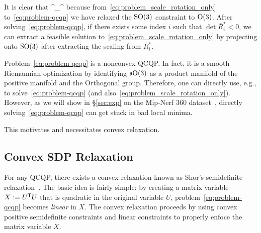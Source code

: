 It is clear that 
\bea\label{eq:qcqp-inequality}
\rho^\star_\qcqp \leq \rho^\star
\eea
because from~\eqref{eq:problem_scale_rotation_only} to~\eqref{eq:problem-qcqp} we have relaxed the $\mathrm{SO}(3)$ constraint to $\mathrm{O}(3)$.
After solving~\eqref{eq:problem-qcqp},  
if there exists some index $i$ such that $\det{\bar{R}_i^\star} < 0$, we can extract a feasible solution to~\eqref{eq:problem_scale_rotation_only} by projecting onto $\mathrm{SO}(3)$ after extracting the scaling from $\bar{R}_i^\star$.

\begin{remark}
    Problem~\eqref{eq:problem-qcqp} is a nonconvex QCQP. In fact, it is a smooth Riemannian optimization by identifying $\mathfrak{s}\mathrm{O}(3)$ as a product manifold of the positive manifold and the Orthogonal group. Therefore, one can directly use, e.g., \manopt to solve~\eqref{eq:problem-qcqp} (and also~\eqref{eq:problem_scale_rotation_only}). However, as we will show in \S\ref{sec:exp} on the Mip-Nerf 360 dataset~\cite{barron2022mipnerf360}, directly solving~\eqref{eq:problem-qcqp} can get stuck in bad local minima. 
\end{remark}

This motivates and necessitates convex relaxation.




\subsection{Convex SDP Relaxation}
\label{sec:sdp-relax}

For any QCQP, there exists a convex relaxation known as Shor's semidefinite relaxation~\cite[Chapter 3]{yang24book-sdp}. The basic idea is fairly simple: by creating a matrix variable $X := U^{\mathsf{T}} U$ that is quadratic in the original variable $U$, problem~\eqref{eq:problem-qcqp} becomes \emph{linear} in $X$. The convex relaxation proceeds by using convex positive semidefinite constraints and linear constraints to properly enfoce the matrix variable $X$. 

